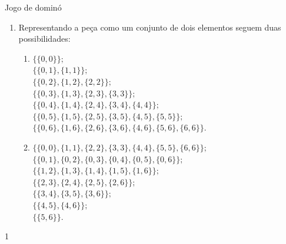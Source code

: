 \begin{answer}{Jogo de dominó}
{
\begin{enumerate}
\item Representando a peça como um conjunto de dois elementos seguem  duas possibilidades:
\begin{enumerate}[leftmargin=0pt, label=\titem{\arabic*.}]\small
\item 
$\{\{0,0\}\};$ \\
$\{\{0,1\}, \{1,1\}\};$\\
$\{\{0,2\}, \{1,2\}, \{2,2\}\};$\\
$\{\{0,3\}, \{1,3\}, \{2,3\}, \{3,3\}\};$\\
$\{\{0,4\}, \{1,4\}, \{2,4\}, \{3,4\}, \{4,4\}\};$\\
$\{\{0,5\}, \{1,5\}, \{2,5\}, \{3,5\}, \{4,5\}, \{5,5\}\};$\\
$\{\{0,6\}, \{1,6\}, \{2,6\}, \{3,6\}, \{4,6\}, \{5,6\}, \{6,6\}\}.$

\item
$\{\{0,0\}, \{1,1\},\{2,2\},\{3,3\}, \{4,4\}, \{5,5\}, \{6,6\} \};$ \\
$\{\{0,1\},\{0,2\},\{0,3\}, \{0,4\}, \{0,5\}, \{0,6\}  \};$\\
$\{\{1,2\}, \{1,3\}, \{1,4\}, \{1,5\}, \{1,6\}\};$\\
$\{\{2,3\}, \{2,4\}, \{2,5\}, \{2,6\}\};$\\
$\{\{3,4\}, \{3,5\}, \{3,6\}\};$\\
$\{ \{4,5\}, \{4,6\}\};$\\
$\{\{5,6\}\}$.\\
\end{enumerate}
\end{enumerate}
}{1}
\end{answer}

